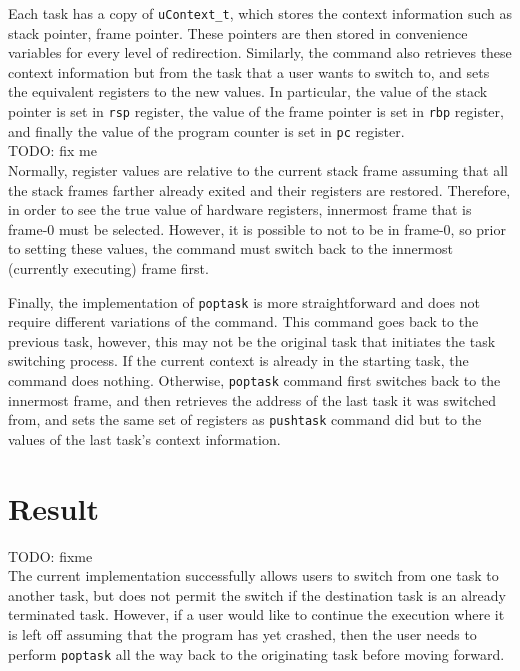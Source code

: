 Each task has a copy of \verb|uContext_t|, which stores the context
information such as stack pointer, frame pointer. These pointers are then stored
in convenience variables for every level of redirection. Similarly, the command
also retrieves these context information but from the task that a user wants to switch to, and
sets the equivalent registers to the new values. In particular, the value of the stack
pointer is set in \verb|rsp| register, the value of the frame pointer is set in \verb|rbp|
register, and finally the value of the program counter is set in \verb|pc| register.
\\
TODO: fix me\\
Normally, register values are relative to the current stack frame assuming that
all the stack frames farther already exited and their registers are restored. Therefore, in
order to see the true value of hardware registers, innermost frame that is
frame-0 must be selected\cite{reference11}. However, it is possible to not to be in frame-0, so prior to setting these values,
the command must switch back to the innermost (currently executing) frame first.

Finally, the implementation of \verb|poptask| is more straightforward and does
not require different variations of the command. This command goes back to the previous task, however, this may not be the original
task that initiates the task switching process. If the current context is
already in the starting task, the command does nothing. Otherwise,
\verb|poptask| command first switches back to the innermost frame, and then
retrieves the
address of the last task it was switched from, and sets the same set of registers as
\verb|pushtask| command did but to the values of the last task's context
information.

\section{Result}
TODO: fixme\\
The current implementation successfully allows users to switch from one task to
another task, but does not permit the switch if the destination task is an already terminated
task. However, if a user would like to continue the execution where it is left
off assuming that the program has yet crashed, then the user needs to perform
\verb|poptask| all the way back to the originating task before moving forward.
